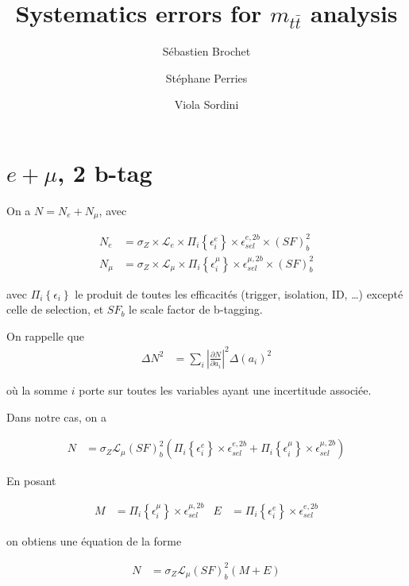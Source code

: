 \documentclass[a4paper,11pt]{article}
\title{Systematics errors for $m_{t\bar{t}}$ analysis}
\author{Sébastien Brochet \and Stéphane Perries \and Viola Sordini}
\begin{document}
\maketitle

\section{$e + \mu$, 2 b-tag}

On a $N = N_e + N_\mu$, avec

\begin{align}
  N_e &= \sigma_Z \times \mathcal{L}_e \times \Pi_i \left\{ \epsilon_i^{e} \right\} \times \epsilon_{sel}^{e, 2b} \times (SF)_b^2 \\
  N_\mu &= \sigma_Z \times \mathcal{L}_\mu \times \Pi_i \left\{ \epsilon_i^{\mu} \right\} \times \epsilon_{sel}^{\mu, 2b} \times (SF)_b^2
\end{align}

avec $\Pi_i \left\{ \epsilon_i  \right\}$ le produit de toutes les efficacités (trigger, isolation, ID, \ldots) excepté celle de selection, et $SF_b$ le scale factor de b-tagging.

On rappelle que
\begin{align}
  \Delta N^2 &= \sum_{i}{\left| \frac{\partial N}{\partial a_i} \right|^2 \Delta \left( a_i \right)^2}
\end{align}

où la somme $i$ porte sur toutes les variables ayant une incertitude associée.

Dans notre cas, on a

\begin{align}
  N &= \sigma_Z \mathcal{L}_\mu (SF)_b^2 \left( \Pi_i \left\{ \epsilon_i^{e} \right\} \times \epsilon_{sel}^{e, 2b} + \Pi_i \left\{ \epsilon_i^{\mu} \right\} \times \epsilon_{sel}^{\mu, 2b} \right)
\end{align}

En posant

\begin{align}
  M &= \Pi_i \left\{ \epsilon_i^{\mu} \right\} \times \epsilon_{sel}^{\mu, 2b} &
  E &= \Pi_i \left\{ \epsilon_i^{e} \right\} \times \epsilon_{sel}^{e, 2b}
\end{align}

on obtiens une équation de la forme

\begin{align}
  N &= \sigma_Z \mathcal{L}_\mu (SF)_b^2 \left( M + E \right)
\end{align}
\end{document}
